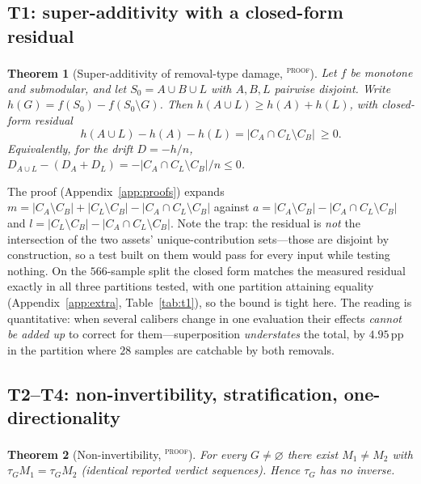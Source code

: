 \documentclass{article}
\newtheorem{theorem}{Theorem}
\newcommand{\pp}{\,\mathrm{pp}}
\newcommand{\evtag}[1]{\textsuperscript{\textsc{#1}}}
\begin{document}
\subsection{T1: super-additivity with a closed-form residual}
\label{sec:T1}

\begin{theorem}[Super-additivity of removal-type damage, \evtag{proof}]
\label{thm:T1}
Let $f$ be monotone and submodular, and let $S_0=A\cup B\cup L$ with $A,B,L$ pairwise disjoint. Write
$h(G)=f(S_0)-f(S_0\setminus G)$. Then $h(A\cup L)\ge h(A)+h(L)$, with closed-form residual
\begin{equation}
h(A\cup L)-h(A)-h(L)=\bigl|C_A\cap C_L\setminus C_B\bigr|\ \ge 0 .
\label{eq:t1residual}
\end{equation}
Equivalently, for the drift $D=-h/n$,
$D_{A\cup L}-(D_A+D_L)=-\bigl|C_A\cap C_L\setminus C_B\bigr|/n\le 0$.
\end{theorem}

The proof (Appendix~\ref{app:proofs}) expands
$m=|C_A\setminus C_B|+|C_L\setminus C_B|-|C_A\cap C_L\setminus C_B|$ against
$a=|C_A\setminus C_B|-|C_A\cap C_L\setminus C_B|$ and
$l=|C_L\setminus C_B|-|C_A\cap C_L\setminus C_B|$. Note the trap: the residual is \emph{not} the
intersection of the two assets' unique-contribution sets---those are disjoint by construction, so a test
built on them would pass for every input while testing nothing. On the $566$-sample split the closed form
matches the measured residual exactly in all three partitions tested, with one partition attaining
equality (Appendix~\ref{app:extra}, Table~\ref{tab:t1}), so the bound is tight here. The reading is
quantitative: when several calibers change in one evaluation their effects \emph{cannot be added up} to
correct for them---superposition \emph{understates} the total, by $4.95\pp$ in the partition where $28$
samples are catchable by both removals.

\subsection{T2--T4: non-invertibility, stratification, one-directionality}
\label{sec:T234}

\begin{theorem}[Non-invertibility, \evtag{proof}]
\label{thm:T2}
For every $G\neq\varnothing$ there exist $M_1\neq M_2$ with $\tau_G M_1=\tau_G M_2$ (identical reported
verdict sequences). Hence $\tau_G$ has no inverse.
\end{theorem}
\end{document}

